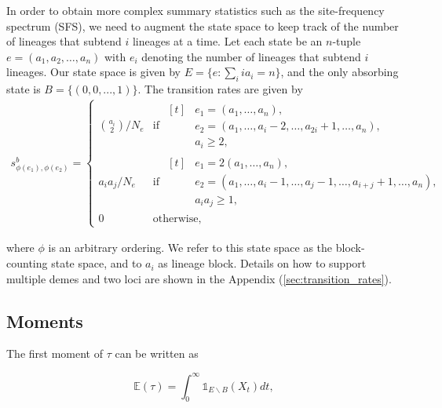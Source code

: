 \documentclass[hidelinks,11pt]{article}
\begin{document}
    In order to obtain more complex summary statistics such as the site-frequency spectrum (SFS), we need to augment the state space to keep track of the number of lineages that subtend $i$ lineages at a time.
    Let each state be an $n$-tuple $e=(a_1, a_2, \dots, a_n)$ with $e_i$ denoting the number of lineages that subtend $i$ lineages.
    Our state space is given by $E=\{e: \sum_i ia_i = n\}$, and the only absorbing state is $B=\{(0, 0, ..., 1)\}$.
    The transition rates are given by~\citep{phasetype_popgen}
    \begin{align*}
        s^b_{\phi(e_1),\phi(e_2)} =
        \begin{cases}
            \binom{a_i}{2} / N_e & \text{if }
            \begin{aligned}[t]
                & e_1=(a_1,\dots,a_n), \\
                & e_2=(a_1,\dots,a_i-2,\dots,a_{2i}+1,\dots,a_{n}), \\
                & a_i \geq 2,
            \end{aligned} \\
            a_i a_j / N_e & \text{if }
            \begin{aligned}[t]
                & e_1=2(a_1,\dots,a_n), \\
                & e_2=(a_1,\dots,a_i-1,\dots,a_j-1,\dots,a_{i+j}+1,\dots,a_{n}), \\
                & a_i a_j \geq 1,
            \end{aligned} \\
            0 & \text{otherwise,}
        \end{cases}
    \end{align*}

    where $\phi$ is an arbitrary ordering.
    We refer to this state space as the block-counting state space, and to $a_i$ as lineage block.
    Details on how to support multiple demes and two loci are shown in the Appendix (\ref{sec:transition_rates}).

    \subsection{Moments}\label{subsec:moments}

    The first moment of $\tau$ can be written as

    \begin{equation*}
        \mathds{E}(\tau) = \int_0^{\infty} \mathds{1}_{E \backslash B}(X_t) dt,
    \end{equation*}
\end{document}
